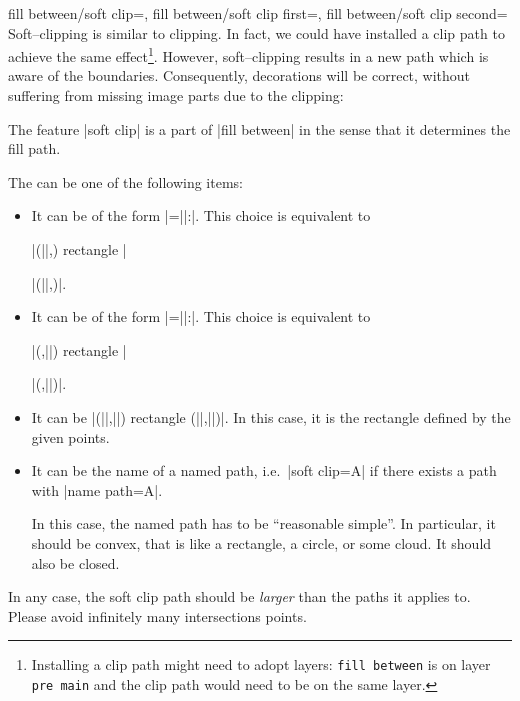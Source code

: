 \begin{tikzkeylist}{%
	fill between/soft clip=,%
	fill between/soft clip first=,%
	fill between/soft clip second=%
}
	Soft--clipping is similar to clipping. In fact, we could have installed a clip path to achieve the same effect\footnote{Installing a clip path might need to adopt layers: \texttt{fill between} is on layer \texttt{pre main} and the clip path would need to be on the same layer.}. However, soft--clipping results in a new path which is aware of the boundaries. Consequently, decorations will be correct, without suffering from missing image parts due to the clipping:
\begin{codeexample}[]
\end{codeexample}

	The feature |soft clip| is a part of |fill between| in the sense that it determines the fill path.

	The  can be one of the following items:
	\begin{itemize}
		\item It can be of the form |=||:|. This choice is equivalent to

			|(||,) rectangle |

			|(||,)|.
		\item It can be of the form |=||:|. This choice is equivalent to

			|(,||) rectangle |

			|(,||)|.
		\item It can be |(||,||) rectangle (||,||)|. In this case, it is the rectangle defined by the given points.
		\item It can be the name of a named path, i.e.\ |soft clip=A| if there exists a path with |name path=A|.

		In this case, the named path has to be ``reasonable simple''. In particular, it should be convex, that is like a rectangle, a circle, or some cloud. It should also be closed.
	\end{itemize}
	In any case, the soft clip path should be \emph{larger} than the paths it applies to. Please avoid infinitely many intersections points.


\end{tikzkeylist}
